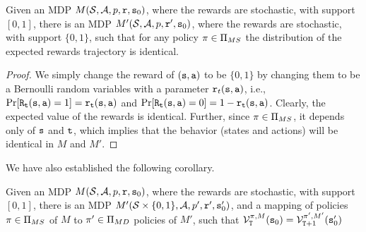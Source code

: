 \begin{theorem}
Given an MDP $M(\mathcal{S},\mathcal{A},p,{\tt r},{\tt s}_0)$, where the
rewards are stochastic, with support $[0,1]$, there is an MDP
$M'(\mathcal{S},\mathcal{A},p,{\tt r}',{\tt s}_0)$, where the rewards are
stochastic, with support $\{0,1\}$,
such that for any policy $\pi\in \Pi_{MS}$ the distribution of
the expected rewards trajectory is identical.
\end{theorem}

\begin{proof}
We simply change the reward of $({\tt s},{\tt a})$ to be $\{0,1\}$ by
changing them to be a Bernoulli random variables with a parameter
${\tt r}_t({\tt s},{\tt a})$, i.e.,
$\Pr[{\tt R}_{\tt t}({\tt s},{\tt a})=1]={\tt r}_{\tt t}({\tt s},{\tt a})$
and
$\Pr[{\tt R}_{\tt t}({\tt s},{\tt a})=0]=1-{\tt r}_{\tt t}({\tt s},{\tt a})$.
Clearly, the expected value of the rewards is identical. Further,
since $\pi\in \Pi_{MS}$, it depends only of ${\tt s}$ and
${\tt t}$, which implies that the behavior (states and actions) will
be identical in $M$ and $M'$.
\end{proof}

We have also established the following corollary.

\begin{corollary}
Given an MDP $M(\mathcal{S},\mathcal{A},p,{\tt r},{\tt s}_0)$, where the
rewards are stochastic, with support $[0,1]$, there is an MDP
$M'(\mathcal{S}\times \{ 0,1\},\mathcal{A},p',{\tt r}',{\tt s}'_0)$, and a
mapping of policies $\pi\in \Pi_{MS}$ of $M$ to $\pi'\in
\Pi_{MD}$ policies of $M'$, such that
$\mathcal{V}_{\tt T}^{\pi,M}({\tt s}_0)=\mathcal{V}_{{\tt T}+1}^{\pi',M'}({\tt s}'_0)$
\end{corollary}

%
%



